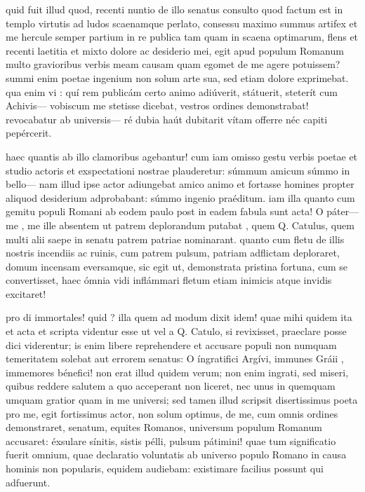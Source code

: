 quid fuit illud quod, recenti nuntio de illo senatus consulto quod factum est in templo virtutis ad ludos scaenamque perlato, consessu maximo summus artifex et me hercule semper partium in re publica tam quam in scaena optimarum, flens et recenti laetitia et mixto dolore ac desiderio mei, egit apud populum Romanum multo gravioribus verbis meam causam quam egomet de me agere potuissem? summi enim poetae ingenium non solum arte sua, sed etiam dolore exprimebat. qua enim vi : quí rem publicám certo animo adiúverit, státuerit, steterít cum Achivis— vobiscum me stetisse dicebat, vestros ordines demonstrabat! revocabatur ab universis— ré dubia haút dubitarit vítam offerre néc capiti pepércerit.

 haec quantis ab illo clamoribus agebantur! cum iam omisso gestu verbis poetae et studio actoris et exspectationi nostrae plauderetur: súmmum amicum súmmo in bello— nam illud ipse actor adiungebat amico animo et fortasse homines propter aliquod desiderium adprobabant: súmmo ingenio praéditum. iam illa quanto cum gemitu populi Romani ab eodem paulo post in eadem fabula sunt acta! O páter— me , me ille absentem ut patrem deplorandum putabat , quem Q. Catulus, quem multi alii saepe in senatu patrem patriae nominarant. quanto cum fletu de illis nostris incendiis ac ruinis, cum patrem pulsum, patriam adflictam deploraret, domum incensam eversamque, sic egit ut, demonstrata pristina fortuna, cum se convertisset, haec ómnia vidi inflámmari fletum etiam inimicis atque invidis excitaret!

 pro di immortales! quid ? illa quem ad modum dixit idem! quae mihi quidem ita et acta et scripta videntur esse ut vel a Q. Catulo, si revixisset, praeclare posse dici viderentur; is enim libere reprehendere et accusare populi non numquam temeritatem solebat aut errorem senatus: O íngratifici Argívi, immunes Gráii , immemores bénefici! non erat illud quidem verum; non enim ingrati, sed miseri, quibus reddere salutem a quo acceperant non liceret, nec unus in quemquam umquam gratior quam in me universi; sed tamen illud scripsit disertissimus poeta pro me, egit fortissimus actor, non solum optimus, de me, cum omnis ordines demonstraret, senatum, equites Romanos, universum populum Romanum accusaret: éxsulare sínitis, sistis pélli, pulsum pátimini! quae tum significatio fuerit omnium, quae declaratio voluntatis ab universo populo Romano in causa hominis non popularis, equidem audiebam: existimare facilius possunt qui adfuerunt.

